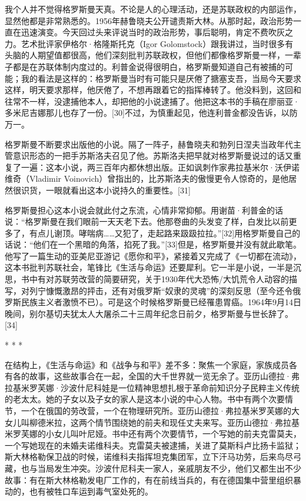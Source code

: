 我个人并不觉得格罗斯曼天真。不论是人的心理活动，还是苏联政权的内部运作，显然他都是非常熟悉的。1956年赫鲁晓夫公开谴责斯大林。从那时起，政治形势一直在迅速演变。今天回过头来评说当时的政治形势，事后聪明，肯定不费吹灰之力。艺术批评家伊格尔·格隆斯托克（Igor Golomstock）跟我讲过，当时很多有头脑的人期望值都很高，他们深刻批判苏联政权，但他们都像格罗斯曼一样，一辈子都是在苏联体制内度过的。利普金说得很明白，格罗斯曼知道自己有被捕的可能；我的看法是这样的：格罗斯曼当时有可能只是厌倦了搪塞支吾，当局今天要求这样，明天要求那样，他厌倦了，不想再跟着它的指挥棒转了。他没料到，这回和往常不一样，没逮捕他本人，却把他的小说逮捕了。他把这本书的手稿在廖丽亚·多米尼吉娜那儿也存了一份。[30]不过，为慎重起见，他连利普金都没告诉，以防万一。

格罗斯曼不断要求出版他的小说。隔了一阵子，赫鲁晓夫和勃列日涅夫当政年代主管意识形态的一把手苏斯洛夫召见了他。苏斯洛夫把早就对格罗斯曼说过的话又重复了一遍：这本小说，两三百年内都休想出版。正如讽刺作家弗拉基米尔·沃伊诺维奇（Vladimir Voinovich）曾指出的，比苏斯洛夫的傲慢更令人惊奇的，是他居然很识货，一眼就看出这本小说持久的重要性。[31]

格罗斯曼担心这本小说会就此付之东流，心情非常抑郁。用谢苗·利普金的话说：“格罗斯曼在我们眼前一天天老下去。他那卷曲的头发变了样，白发比以前更多了，有点儿谢顶。哮喘病……又犯了，走起路来趿趿拉拉。”[32]用格罗斯曼自己的话说：“他们在一个黑暗的角落，掐死了我。”[33]但是，格罗斯曼并没有就此歇笔。他写了一篇生动的亚美尼亚游记《愿你和平》，紧接着又完成了《一切都在流动》，这本书批判苏联社会，笔锋比《生活与命运》还要犀利。它一半是小说，一半是沉思，书中有对苏联劳改营的简要研究，关于1930年代大恐怖/大饥荒令人动容的描写，对列宁慷慨激昂的抨击，还有对俄罗斯“奴隶的灵魂”的深刻反思（至今还令俄罗斯民族主义者激愤不已）。可是这个时候格罗斯曼已经罹患胃癌。1964年9月14日晚间，别尔基切夫犹太人大屠杀二十三周年纪念日前夕，格罗斯曼与世长辞了。[34]

* * *

在结构上，《生活与命运》和《战争与和平》差不多：聚焦一个家庭，家族成员各有各的故事，这些故事合在一起，全国的大千世界就一览无余了。亚历山德拉·弗拉基米罗芙娜·沙波什尼科娃是一位精神思想扎根于革命前知识分子民粹主义传统的老太太。她的子女以及子女的家人是这本小说的中心人物。书中有两个次要情节，一个在俄国的劳改营，一个在物理研究所。亚历山德拉·弗拉基米罗芙娜的大女儿叫柳德米拉，这两个情节围绕她的前夫和现任丈夫来写。亚历山德拉·弗拉基米罗芙娜的小女儿叫叶尼娅。书中还有两个次要情节，一个写她的前夫克雷莫夫，一个写她现在的未婚夫诺维科夫。克雷莫夫被逮捕，关进了莫斯科卢比扬卡监狱；斯大林格勒保卫战的时候，诺维科夫指挥坦克集团军，立下汗马功劳，后来鸟尽弓藏，也与当局发生冲突。沙波什尼科夫一家人，亲戚朋友不少，他们又都生出不少故事：有在斯大林格勒发电厂工作的，有在前线当兵的，有在德国集中营里组织暴动的，也有被牲口车运到毒气室处死的。

